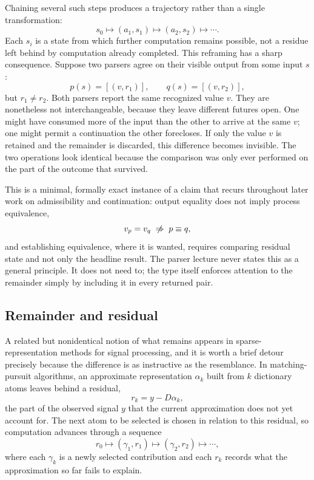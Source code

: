 \documentclass[11pt]{article}
\begin{document}
Chaining several such steps produces a trajectory rather than a single transformation:
\[
s_0 \longmapsto (a_1, s_1) \longmapsto (a_2, s_2) \longmapsto \cdots.
\]
Each $s_i$ is a state from which further computation remains possible, not a residue left behind by computation already completed. This reframing has a sharp consequence. Suppose two parsers agree on their visible output from some input $s$:
\[
p(s) = [(v, r_1)], \qquad q(s) = [(v, r_2)],
\]
but $r_1 \neq r_2$. Both parsers report the same recognized value $v$. They are nonetheless not interchangeable, because they leave different futures open. One might have consumed more of the input than the other to arrive at the same $v$; one might permit a continuation the other forecloses. If only the value $v$ is retained and the remainder is discarded, this difference becomes invisible. The two operations look identical because the comparison was only ever performed on the part of the outcome that survived.

This is a minimal, formally exact instance of a claim that recurs throughout later work on admissibility and continuation: output equality does not imply process equivalence,
\[
v_p = v_q \;\centernot\Rightarrow\; p \equiv q,
\]
and establishing equivalence, where it is wanted, requires comparing residual state and not only the headline result. The parser lecture never states this as a general principle. It does not need to; the type itself enforces attention to the remainder simply by including it in every returned pair.

\subsection{Remainder and residual}

A related but nonidentical notion of what remains appears in sparse-representation methods for signal processing, and it is worth a brief detour precisely because the difference is as instructive as the resemblance. In matching-pursuit algorithms, an approximate representation $\alpha_k$ built from $k$ dictionary atoms leaves behind a residual,
\[
r_k = y - D\alpha_k,
\]
the part of the observed signal $y$ that the current approximation does not yet account for. The next atom to be selected is chosen in relation to this residual, so computation advances through a sequence
\[
r_0 \longmapsto (\gamma_1, r_1) \longmapsto (\gamma_2, r_2) \longmapsto \cdots,
\]
where each $\gamma_k$ is a newly selected contribution and each $r_k$ records what the approximation so far fails to explain.
\end{document}
